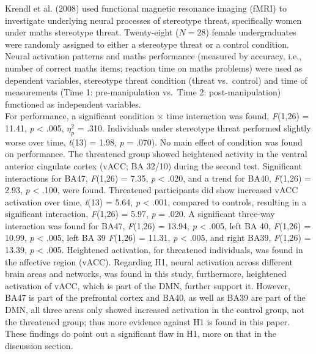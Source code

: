 \documentclass[
  stu, a4paper,floatsintext]{apa7}
\begin{document}
Krendl et al. (2008) used functional magnetic resonance imaging (fMRI) to investigate underlying neural processes of stereotype threat, specifically women under maths stereotype threat.
Twenty-eight (\(N = 28\)) female undergraduates were randomly assigned to either a stereotype threat or a control condition.
Neural activation patterns and maths performance (measured by accuracy, i.e., number of correct maths items; reaction time on maths problems) were used as dependent variables, stereotype threat condition (threat vs.~control) and time of measurements (Time 1: pre-manipulation vs.~Time 2: post-manipulation) functioned as independent variables.\\
For performance, a significant condition \(\times\) time interaction was found, \emph{F}(1,26) = 11.41, \emph{p} \textless{} .005, \(\eta^{2}_{p}\) = .310.
Individuals under stereotype threat performed slightly worse over time, \emph{t}(13) = 1.98, \emph{p} = .070).
No main effect of condition was found on performance.
The threatened group showed heightened activity in the ventral anterior cingulate cortex (vACC; BA 32/10) during the second test.
Significant interactions for BA47, \emph{F}(1,26) = 7.35, \emph{p} \textless{} .020, and a trend for BA40, \emph{F}(1,26) = 2.93, \emph{p} \textless{} .100, were found.
Threatened participants did show increased vACC activation over time, \emph{t}(13) = 5.64, \emph{p} \textless{} .001, compared to controls, resulting in a significant interaction, \emph{F}(1,26) = 5.97, \emph{p} = .020.
A significant three-way interaction was found for BA47, \emph{F}(1,26) = 13.94, \emph{p} \textless{} .005, left BA 40, \emph{F}(1,26) = 10.99, \emph{p} \textless{} .005, left BA 39 \emph{F}(1,26) = 11.31, \emph{p} \textless{} .005, and right BA39, \emph{F}(1,26) = 13.39, \emph{p} \textless{} .005.
Heightened activation, for threatened individuals, was found in the affective region (vACC).
Regarding H1, neural activation across different brain areas and networks, was found in this study, furthermore, heightened activation of vACC, which is part of the DMN, further support it.
However, BA47 is part of the prefrontal cortex and BA40, as well as BA39 are part of the DMN, all three areas only showed increased activation in the control group, not the threatened group; thus more evidence against H1 is found in this paper.
These findings do point out a significant flaw in H1, more on that in the discussion section.
\end{document}
